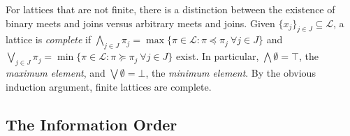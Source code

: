 \documentclass[conference]{ieeeconf}
\renewcommand{\preceq}{\preccurlyeq}
\renewcommand{\succeq}{\succcurlyeq}
\newcommand{\lattice}{\mathcal{L}}
\newcommand{\join}{\vee}
\newcommand{\meet}{\wedge}
\newcommand{\bigjoin}{\bigvee}
\newcommand{\bigmeet}{\bigwedge}
\newtheorem{lemma}{Lemma}
\begin{document}


For lattices that are not finite, there is a distinction between the existence of binary meets and joins versus arbitrary meets and joins. Given $\{x_j\}_{j \in J} \subseteq \lattice$, a lattice is \emph{complete} if $\bigmeet_{j \in J} \pi_j = \max\{\pi \in \lattice : \pi \preceq \pi_j~\forall j \in J\}$ and $\bigjoin_{j \in J} \pi_j  = \min\{\pi \in \lattice : \pi \succeq \pi_j~\forall j \in J\}$ exist.
In particular, $\bigmeet \emptyset = \top$, the \emph{maximum element}, and $\bigjoin \emptyset = \bot$, the \emph{minimum element}. By the obvious induction argument, finite lattices are complete.

\vspace{-0.75em}
\subsection{The Information Order}
\vspace{-0.25em}
\end{document}

